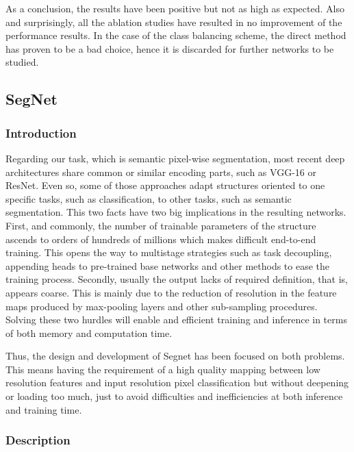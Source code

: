 \documentclass[12pt,a4paper]{article}
\begin{document}
As a conclusion, the results have been positive but not as high as expected. Also and surprisingly, all the ablation studies have resulted in no improvement of the performance results. In the case of the class balancing scheme, the direct method has proven to be a bad choice, hence it is discarded for further networks to be studied.\newline

\subsection{SegNet}

\subsubsection{Introduction}

Regarding our task, which is semantic pixel-wise segmentation, most recent deep architectures share common or similar encoding parts, such as VGG-16 or ResNet. Even so, some of those approaches adapt structures oriented to one specific tasks, such as classification, to other tasks, such as semantic segmentation. This two facts have two big implications in the resulting networks. First, and commonly, the number of trainable parameters of the structure ascends to orders of hundreds of millions which makes difficult end-to-end training. This opens the way to multistage strategies such as task decoupling, appending heads to pre-trained base networks and other methods to ease the training process. Secondly, usually the output lacks of required definition, that is, appears coarse. This is mainly due to the reduction of resolution in the feature maps produced by max-pooling layers and other sub-sampling procedures. Solving these two hurdles will enable and efficient training and inference in terms of both memory and computation time. \newline

Thus, the design and development of Segnet has been focused on both problems. This means having the requirement of a high quality mapping between low resolution features and  input resolution pixel classification but without deepening or loading too much, just to avoid difficulties and inefficiencies at both inference and training time. 

\subsubsection{Description}
\end{document}

